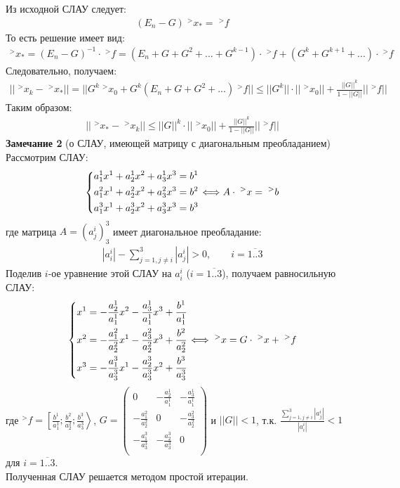 \documentclass[__main__.tex]{subfiles}
\begin{document}
Из исходной СЛАУ следует:
\begin{gather*}
(E_n-G)\;^>x_*=\;^>f
\end{gather*}
То есть решение имеет вид:
\begin{gather*}
^>x_*=(E_n-G)^{-1}\cdot \;^>f =(E_n+G+G^2+...+G^{k-1})\cdot \;^>f+(G^k+G^{k+1}+...)\cdot \;^>f
\end{gather*}
Следовательно, получаем:
\begin{gather*}
||\;^>x_k-\;^>x_*||=||G^k\;^>x_0+G^k(E_n+G+G^2+...)\;^>f|| \leqslant ||G^k||\cdot ||\;^>x_0||+\frac{||G||^k}{1-||G||}||\;^>f||
\end{gather*}
Таким образом:
\begin{gather*}
||\;^>x_*-\;^>x_k||\leqslant ||G||^k\cdot ||\;^>x_0||+\frac{||G||^k}{1-||G||}||\;^>f||
\end{gather*}
\textbf{Замечание 2} (о СЛАУ, имеющей матрицу с диагональным преобладанием)\\

Рассмотрим СЛАУ:
\begin{gather*}
\left\{
	\begin{gathered}
	a^1_1x^1+a^1_2x^2+a^1_3x^3=b^1 \hfill \\
	a^2_1x^1+a^2_2x^2+a^2_3x^3=b^2 \hfill \\
	a^3_1x^1+a^3_2x^2+a^3_3x^3=b^3 \hfill \\
	\end{gathered}
\right. \Longleftrightarrow A\cdot \;^>x=\;^>b
\end{gather*}
где матрица $A=(a^i_j)^3_3$ имеет диагональное преобладание:
\begin{gather*}
|a^i_i|-\sum\limits^3_{j=1, j\neq i}|a^i_j|>0, \qquad i=\overline{1..3} 
\end{gather*}
Поделив $i$-ое уравнение этой СЛАУ на $a^i_i$ ($i=\overline{1..3}$), получаем равносильную СЛАУ:
\begin{gather*}
\left\{
	\begin{gathered}
	x^1=-\frac{a^1_2}{a^1_1}x^2-\frac{a^1_3}{a^1_1}x^3+\frac{b^1}{a^1_1} \hfill \\
	x^2=-\frac{a^2_1}{a^2_2}x^1-\frac{a^2_3}{a^2_2}x^3+\frac{b^2}{a^2_2} \hfill \\
	x^3=-\frac{a^3_1}{a^3_3}x^1-\frac{a^3_2}{a^3_3}x^2+\frac{b^3}{a^3_3} \hfill \\
	\end{gathered}
\right. \Longleftrightarrow  \;^>x=G\cdot \;^>x+\;^>f
\end{gather*}
где $^>f=\left[\frac{b^1}{a^1_1}; \frac{b^2}{a^2_2}; \frac{b^3}{a^3_3}\right\rangle$, $G=\left(
\begin{matrix}
0 & -\frac{a^1_2}{a^1_1} & -\frac{a^1_3}{a^1_1} \\
-\frac{a^2_1}{a^2_2} & 0 & -\frac{a^2_3}{a^2_2} \\
-\frac{a^3_1}{a^3_3} & -\frac{a^3_2}{a^3_3} & 0 \\
\end{matrix}
\right)$ и $||G||<1$, т.к. $\frac{\sum\limits^3_{j=1, j\neq i}|a^i_j|}{|a^i_i|}<1$ для $i=\overline{1..3}$.\\
Полученная СЛАУ решается методом простой итерации.\\
\end{document}
